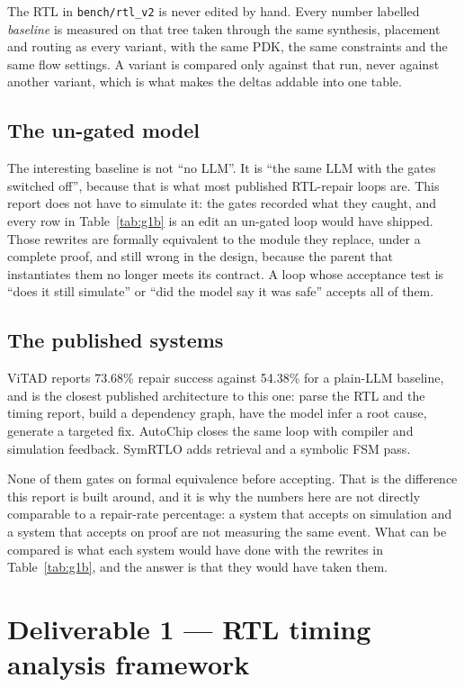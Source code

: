\documentclass[11pt,a4paper]{article}
\begin{document}
The RTL in \texttt{bench/rtl\_v2} is never edited by hand. Every number
labelled \emph{baseline} is
measured on that tree taken through the same synthesis, placement and routing
as every variant, with the same PDK, the same constraints and the same flow
settings. A variant is compared only against that run, never against another
variant, which is what makes the deltas addable into one table.

\subsection{The un-gated model}

The interesting baseline is not ``no LLM''. It is ``the same LLM with the gates
switched off'', because that is what most published RTL-repair loops are. This report does not have to simulate it: the gates recorded what they
caught, and every row in Table~\ref{tab:g1b} is an edit an un-gated loop would
have shipped. Those rewrites are formally equivalent to the module they
replace, under a complete proof, and still wrong in the design, because the
parent that instantiates them no longer meets its contract. A loop whose
acceptance test is ``does it still simulate'' or ``did the model say it was
safe'' accepts all of them.

\subsection{The published systems}
\label{sec:related}

ViTAD reports 73.68\% repair success against 54.38\% for a plain-LLM baseline,
and is the closest published architecture to this one: parse the RTL and the
timing report, build a dependency graph, have the model infer a root cause,
generate a targeted fix. AutoChip closes the same loop with compiler and
simulation feedback. SymRTLO adds retrieval and a symbolic FSM pass.

None of them gates on formal equivalence before accepting. That is the
difference this report is built around, and it is why the numbers here are not
directly comparable to a repair-rate percentage: a system that accepts on
simulation and a system that accepts on proof are not measuring the same
event. What can be compared is what each system would have done with the
rewrites in Table~\ref{tab:g1b}, and the answer is that they would have taken
them.

\section{Deliverable 1 --- RTL timing analysis framework}
\label{sec:d1}
\end{document}
